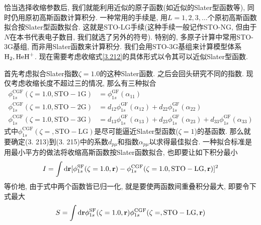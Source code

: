 恰当选择收缩参数后, 
我们就能利用近似的原子\hft 函数(如近似的Slater型函数等), 
同时仍用原初高斯函数计算积分. 
一种常用的手续是, 
用$L=1,2,3,\ldots$个原初高斯函数拟合按Slater型函数拟合. 
这就是STO-LG手续(这种手续一般记作STO-NG, 
但由于$N$在本书代表电子数目, 
我们就选了另外的符号). 
特别的, 
多原子计算中常用STO-3G基组, 
而非用Slater函数来计算积分. 
我们会用STO-3G基组来计算模型体系$\mathrm{H}_2,\mathrm{HeH}^+$. 
现在需要考虑收缩式\eqref{3.212}的具体形式以令其可以近似Slater型函数.


首先考虑拟合Slater指数$\zeta=1.0$的这种Slater函数. 
之后会回头研究不同的指数. 
现仅考虑收缩长度不超过三的情况, 
那么有三种拟合
\begin{align}
	\phi_{1s}^\mathrm{CGF}(\zeta=1.0, \mathrm{STO-1G}) &= \phi_{1s}^\mathrm{GF}(\alpha_{11})\\
	\phi_{1s}^\mathrm{CGF}(\zeta=1.0, \mathrm{STO-2G}) &= d_{12}\phi_{1s}^\mathrm{GF}(\alpha_{12}) + d_{22}\phi_{1s}^\mathrm{GF}(\alpha_{22})\\
	\phi_{1s}^\mathrm{CGF}(\zeta=1.0, \mathrm{STO-3G}) &= d_{13}\phi_{1s}^\mathrm{GF}(\alpha_{13}) + d_{23}\phi_{1s}^\mathrm{GF}(\alpha_{23}) + d_{33}\phi_{1s}^\mathrm{GF}(\alpha_{33})
\end{align}
式中$\phi_{1s}^\mathrm{CGF}(\zeta=, \mathrm{STO-LG})$是尽可能逼近Slater型函数($\zeta=1$)的基函数. 
那么就要确定(3.
213)到(3.
215)中的系数$d_{p\mu}$和指数$\alpha_{p\mu}$以求得最佳拟合. 
一种拟合标准是用最小平方的做法将收缩高斯函数按Slater函数拟合,
也即要让如下积分最小
\begin{align}
	I = \int\dd{r}[\phi_{1s}^\mathrm{SF}(\zeta=1.0,\bfr) - \phi_{1s}^\mathrm{CGF}(\zeta=1.0, \mathrm{STO-LG},\bfr)]^2
\end{align}
等价地, 
由于式中两个函数皆已归一化, 
就是要使两函数间重叠积分最大, 
即要令下式最大
\begin{align}
	S = \int\dd{r}\phi_{1s}^\mathrm{SF}(\zeta=1.0,\bfr)\phi_{1s}^\mathrm{CGF}(\zeta=, \mathrm{STO-LG},\bfr)
\end{align}

